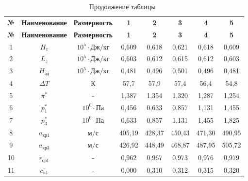 	\begin{center}
		\begin{longtable}{|c|c|c|c|c|c|c|c|}
			\caption{Сводная таблица параметров КВД} \label{tab:hpc-stage-total}
			\endfirsthead
			\caption*{\tabcapalign Продолжение таблицы~\thetable}\\[-0.45\onelineskip]
			\hline
			\textbf{№} &
			\textbf{Наименование} &
			\textbf{Размерность} &
			\textbf{1} &
			\textbf{2} &
			\textbf{3} &
			\textbf{4} &
			\textbf{5} \\\hline
			\endhead
			\hline
			\textbf{№} &
			\textbf{Наименование} &
			\textbf{Размерность} &
			\textbf{1} &
			\textbf{2} &
			\textbf{3} &
			\textbf{4} &
			\textbf{5}  \\\hline
			
				1 & $H_т$ & $10^5 \cdot Дж/кг$ & 0,609 & 0,618 & 0,621 & 0,618 & 0,609 \\\hline
			
				2 & $L_z$ & $10^5 \cdot Дж/кг$ & 0,603 & 0,612 & 0,615 & 0,612 & 0,603 \\\hline
			
				3 & $H_{ад}$ & $10^5 \cdot Дж/кг$ & 0,481 & 0,496 & 0,501 & 0,496 & 0,481 \\\hline
			
				4 & $\Delta T$ & $К$ & 57,7 & 57,9 & 57,4 & 56,4 & 54,8 \\\hline
			
				5 & $\pi^*$ & - & 1,387 & 1,354 & 1,320 & 1,287 & 1,254 \\\hline
			
				6 & $p_1^*$ & $10^6 \cdot Па$ & 0,456 & 0,633 & 0,857 & 1,131 & 1,455 \\\hline
			
				7 & $p_3^*$ & $10^6 \cdot Па$ & 0,633 & 0,857 & 1,131 & 1,455 & 1,825 \\\hline
			
				8 & $a_{кр1}$ & $м/с$ & 405,19 & 428,37 & 450,43 & 471,30 & 490,95 \\\hline
			
				9 & $a_{кр3}$ & $м/с$ & 426,92 & 448,49 & 468,87 & 487,95 & 505,72 \\\hline
			
				10 & $\overline{r_{ср1}}$ & - & 0,962 & 0,967 & 0,973 & 0,976 & 0,979 \\\hline
			
				11 & $\overline{c_{u1}}$ & - & 0,000 & 0,310 & 0,312 & 0,315 & 0,320 \\\hline
			

\end{longtable}
\end{center}
